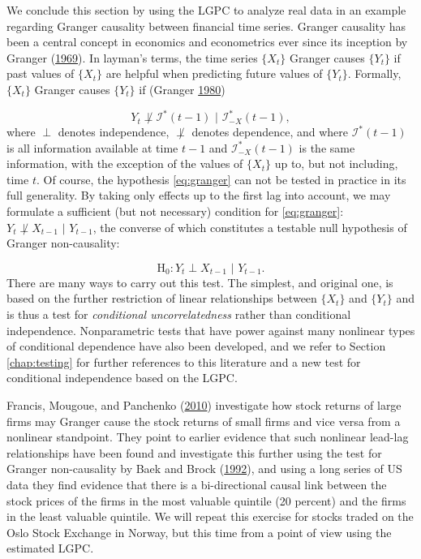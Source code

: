 \documentclass[
  12pt,
  letterpaper]{article}
\theoremstyle{definition}
\theoremstyle{definition}
\theoremstyle{definition}
\theoremstyle{remark}
\begin{document}
We conclude this section by using the LGPC to analyze real data in an example regarding Granger causality between financial time series. Granger causality has been a central concept in economics and econometrics ever since its inception by Granger (\protect\hyperlink{ref-granger1969investigating}{1969}). In layman's terms, the time series \(\{X_t\}\) Granger causes \(\{Y_t\}\) if past values of \(\{X_t\}\) are helpful when predicting future values of \(\{Y_t\}\). Formally, \(\{X_t\}\) Granger causes \(\{Y_t\}\) if (Granger \protect\hyperlink{ref-granger1980testing}{1980})

\begin{equation}
Y_t \not\perp \mathcal{I}^*(t-1) \,\,|\,\, \mathcal{I}_{-X}^*(t-1),
\label{eq:granger}
\end{equation}
where \(\perp\) denotes independence, \(\not\perp\) denotes dependence, and where \(\mathcal{I}^*(t-1)\) is all information available at time \(t-1\) and \(\mathcal{I}_{-X}^*(t-1)\) is the same information, with the exception of the values of \(\{X_t\}\) up to, but not including, time \(t\). Of course, the hypothesis \eqref{eq:granger} can not be tested in practice in its full generality. By taking only effects up to the first lag into account, we may formulate a sufficient (but not necessary) condition for \eqref{eq:granger}: \(Y_t \not\perp X_{t-1} \,\,|\,\, Y_{t-1}\), the converse of which constitutes a testable null hypothesis of Granger non-causality:

\begin{equation}
\textrm{H}_0: Y_t \perp X_{t-1} \,\,|\,\, Y_{t-1}.
\label{eq:grangernull}
\end{equation}
There are many ways to carry out this test. The simplest, and original one, is based on the further restriction of linear relationships between \(\{X_t\}\) and \(\{Y_t\}\) and is thus a test for \emph{conditional uncorrelatedness} rather than conditional independence. Nonparametric tests that have power against many nonlinear types of conditional dependence have also been developed, and we refer to Section \ref{chap:testing} for further references to this literature and a new test for conditional independence based on the LGPC.

Francis, Mougoue, and Panchenko (\protect\hyperlink{ref-fran:moug:vale:2010}{2010}) investigate how stock returns of large firms may Granger cause the stock returns of small firms and vice versa from a nonlinear standpoint. They point to earlier evidence that such nonlinear lead-lag relationships have been found and investigate this further using the test for Granger non-causality by Baek and Brock (\protect\hyperlink{ref-baek:broc:1992}{1992}), and using a long series of US data they find evidence that there is a bi-directional causal link between the stock prices of the firms in the most valuable quintile (20 percent) and the firms in the least valuable quintile. We will repeat this exercise for stocks traded on the Oslo Stock Exchange in Norway, but this time from a point of view using the estimated LGPC.
\end{document}
